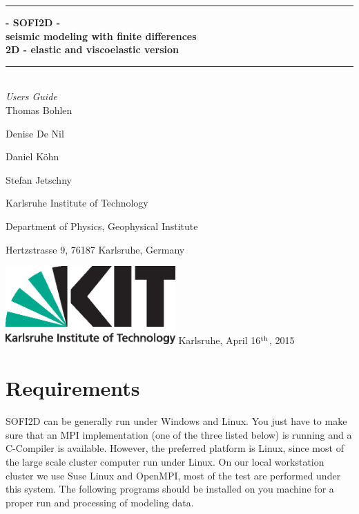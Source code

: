 \documentclass[11pt,onecolumn,oneside]{article}
\begin{document}
\thispagestyle{empty}
\newcommand{\Rule}{\rule{\textwidth}{1mm}}
\newtheorem{theorem}{Hypothese}[section]
\begin{center}
\Rule \vspace{5mm}
\sffamily \bfseries \Huge
- SOFI2D - \\ 
seismic modeling with finite differences \\
2D - elastic and viscoelastic version
\vspace{1mm}\Rule\\
\vspace{1 cm}
\Large\emph{Users Guide}\\
\vspace{2 cm}
\large Thomas Bohlen \par
\large Denise De Nil \par
\large Daniel K\"ohn \par
\large Stefan Jetschny\par
\vspace{2 cm}

\small Karlsruhe Institute of Technology\par
\small Department of Physics, Geophysical Institute \par
\small Hertzstrasse 9, 76187 Karlsruhe, Germany \par

\vfill
\includegraphics[height=30mm]{eps/kit_logo_en_4c_positiv.eps}
\vfill
\large Karlsruhe, April 16$^{\rm{th}}$, 2015
\end{center}
\cleardoublepage
\thispagestyle{empty} 
\cleardoublepage
\thispagestyle{empty}
\ClearShipoutPicture

\tableofcontents
\newpage

\section{Requirements}
\label{requirements}

SOFI2D can be generally run under Windows and Linux. You just have to make sure that an MPI implementation (one of the three listed below) is running and a C-Compiler is available. However, the preferred platform is Linux, since most of the large scale cluster computer run under Linux. On our local workstation cluster we use Suse Linux and OpenMPI, most of the test are performed under this system. The following programs should be installed on you machine for a proper run and processing of modeling data. 
\end{document}
